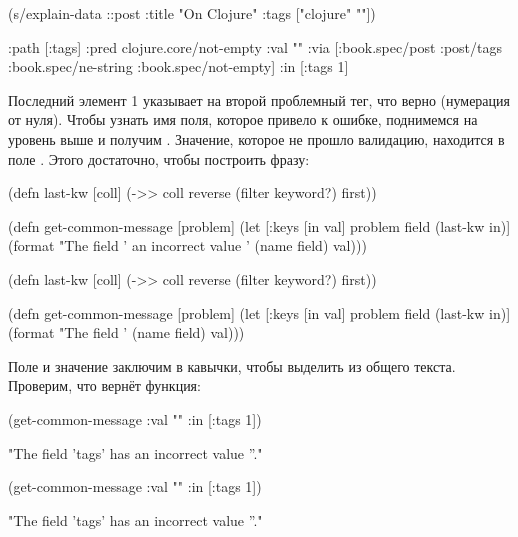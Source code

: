 \else


\begin{clojure}
(s/explain-data ::post {:title "On Clojure"
                        :tags ["clojure" ""]})

{:path [:tags]
 :pred clojure.core/not-empty
 :val ""
 :via [:book.spec/post
       :post/tags
       :book.spec/ne-string
       :book.spec/not-empty]
 :in [:tags 1]}
\end{clojure}


\fi

Последний элемент 1 указывает на второй проблемный тег, что верно (нумерация от
нуля). Чтобы узнать имя поля, которое привело к ошибке, поднимемся на уровень
выше и получим . Значение, которое не прошло валидацию, находится в
поле . Этого достаточно, чтобы построить фразу:

\ifnarrow


\begin{clojure}
(defn last-kw [coll]
  (->> coll
       reverse
       (filter keyword?)
       first))

(defn get-common-message
  [problem]
  (let [{:keys [in val]} problem
        field (last-kw in)]
    (format
      "The field '%
                an incorrect value '%
      (name field) val)))
\end{clojure}


\else


\begin{clojure}
(defn last-kw [coll]
  (->> coll
       reverse
       (filter keyword?)
       first))

(defn get-common-message
  [problem]
  (let [{:keys [in val]} problem
        field (last-kw in)]
    (format "The field '%
            (name field) val)))
\end{clojure}


\fi

Поле и значение заключим в кавычки, чтобы выделить из общего текста. Проверим,
что вернёт функция:

\ifnarrow


\begin{clojure}
(get-common-message
  {:val "" :in [:tags 1]})

"The field 'tags' has
          an incorrect value ''."
\end{clojure}


\else


\begin{clojure}
(get-common-message {:val "" :in [:tags 1]})

"The field 'tags' has an incorrect value ''."
\end{clojure}


